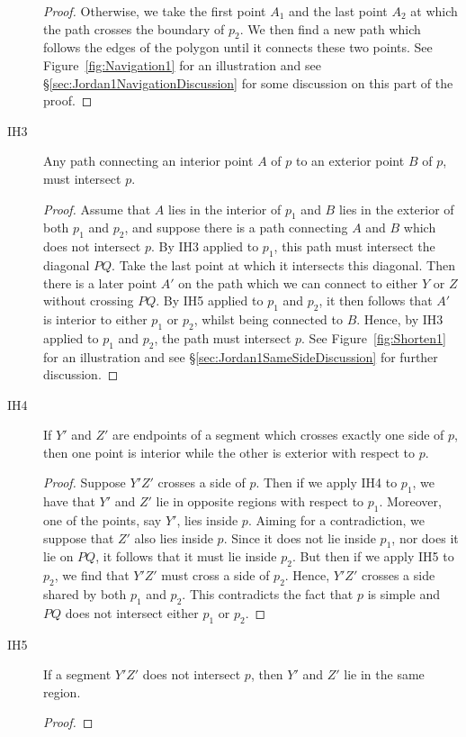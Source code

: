 \begin{description}
\begin{proof}
    Otherwise, we take the first point $A_1$ and the last point $A_2$ at which the path crosses the boundary of $p_2$. We then find a new path which follows the edges of the polygon until it connects these two points. See Figure~\ref{fig:Navigation1} for an illustration and see \S\ref{sec:Jordan1NavigationDiscussion} for some discussion on this part of the proof.
  \end{proof}
\item[IH3] Any path connecting an interior point $A$ of $p$ to an exterior point $B$ of $p$, must intersect $p$.
  \begin{proof}
    Assume that $A$ lies in the interior of $p_1$ and $B$ lies in the exterior of both $p_1$ and $p_2$, and suppose there is a path connecting $A$ and $B$ which does not intersect $p$. By IH3 applied to $p_1$, this path must intersect the diagonal $PQ$. Take the last point at which it intersects this diagonal. Then there is a later point $A'$ on the path which we can connect to either $Y$ or $Z$ without crossing $PQ$. By IH5 applied to $p_1$ and $p_2$, it then follows that $A'$ is interior to either $p_1$ or $p_2$, whilst being connected to $B$. Hence, by IH3 applied to $p_1$ and $p_2$, the path must intersect $p$. See Figure~\ref{fig:Shorten1} for an illustration and see \S\ref{sec:Jordan1SameSideDiscussion} for further discussion.
  \end{proof}
\item[IH4] If $Y'$ and $Z'$ are endpoints of a segment which crosses exactly one side of $p$, then one point is interior while the other is exterior with respect to $p$.
  \begin{proof}
    Suppose $Y'Z'$ crosses a side of $p$. Then if we apply IH4 to $p_1$, we have that $Y'$ and $Z'$ lie in opposite regions with respect to $p_1$. Moreover, one of the points, say $Y'$, lies inside $p$. Aiming for a contradiction, we suppose that $Z'$ also lies inside $p$. Since it does not lie inside $p_1$, nor does it lie on $PQ$, it follows that it must lie inside $p_2$. But then if we apply IH5 to $p_2$, we find that $Y'Z'$ must cross a side of $p_2$. Hence, $Y'Z'$ crosses a side shared by both $p_1$ and $p_2$. This contradicts the fact that $p$ is simple and $PQ$ does not intersect either $p_1$ or $p_2$.
  \end{proof}
\item[IH5] If a segment $Y'Z'$ does not intersect $p$, then $Y'$ and $Z'$ lie in the same region.
  \begin{proof}

\end{proof}
\end{description}

